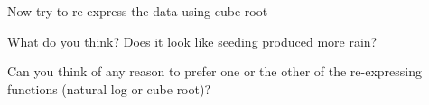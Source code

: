\documentclass[12pt,letterpaper]{hmcpset}
\begin{document}
\begin{problem}[$\text{e}_2$]

     Now try to re-express the data using cube root

\end{problem}

\begin{solution}

\end{solution}
\newpage

\begin{problem}[f]

    What do you think? Does it look like seeding produced more rain?

\end{problem}

\begin{solution}

\end{solution}
\newpage

\begin{problem}[g]

     Can you think of any reason to prefer one or the other of the re-expressing functions (natural log or cube root)?

\end{problem}

\begin{solution}

\end{solution}
\end{document}
